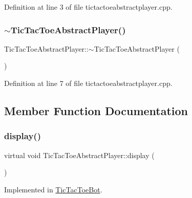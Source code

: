 Definition at line 3 of file tictactoeabstractplayer.\+cpp.

\mbox{\label{class_tic_tac_toe_abstract_player_a5dbbe0fb30cd3acbae13d9a895b9bcd1}} 
\subsubsection{\texorpdfstring{$\sim$\+Tic\+Tac\+Toe\+Abstract\+Player()}{~TicTacToeAbstractPlayer()}}
{\footnotesize\ttfamily Tic\+Tac\+Toe\+Abstract\+Player\+::$\sim$\+Tic\+Tac\+Toe\+Abstract\+Player (\begin{DoxyParamCaption}{ }\end{DoxyParamCaption})\hspace{0.3cm}{\ttfamily [virtual]}}



Definition at line 7 of file tictactoeabstractplayer.\+cpp.



\subsection{Member Function Documentation}
\mbox{\label{class_tic_tac_toe_abstract_player_a4c36b375285f4d1511a11de121d0e5dc}} 
\subsubsection{\texorpdfstring{display()}{display()}}
{\footnotesize\ttfamily virtual void Tic\+Tac\+Toe\+Abstract\+Player\+::display (\begin{DoxyParamCaption}{ }\end{DoxyParamCaption})\hspace{0.3cm}{\ttfamily [pure virtual]}}



Implemented in \hyperlink{class_tic_tac_toe_bot_a2af7f24506849f05ed37e9750b515c3d}{Tic\+Tac\+Toe\+Bot}.

